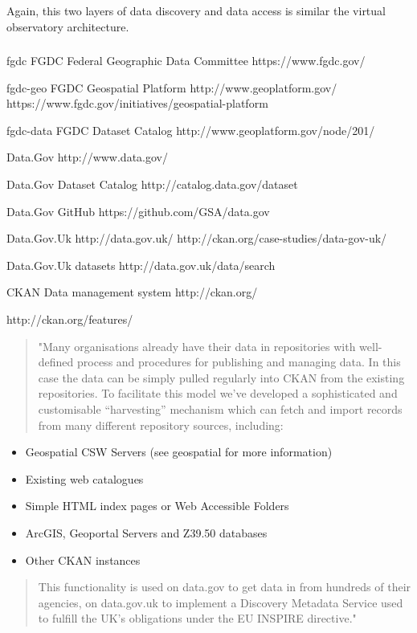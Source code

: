 \documentclass{article}
\begin{document}
Again, this two layers of data discovery and data access
is similar the virtual observatory architecture.


\subsubsection{}

fgdc
FGDC
Federal Geographic Data Committee
https://www.fgdc.gov/

fgdc-geo
FGDC Geospatial Platform
http://www.geoplatform.gov/
https://www.fgdc.gov/initiatives/geospatial-platform

fgdc-data
FGDC Dataset Catalog
http://www.geoplatform.gov/node/201/%

Data.Gov
http://www.data.gov/

Data.Gov Dataset Catalog
http://catalog.data.gov/dataset

Data.Gov GitHub
https://github.com/GSA/data.gov


Data.Gov.Uk
http://data.gov.uk/
http://ckan.org/case-studies/data-gov-uk/

Data.Gov.Uk datasets
http://data.gov.uk/data/search



CKAN Data management system
http://ckan.org/


http://ckan.org/features/
\begin{quote}
"Many organisations already have their data in repositories with well-defined process and procedures
for publishing and managing data. In this case the data can be simply pulled regularly into CKAN
from the existing repositories. To facilitate this model we’ve developed a sophisticated and
customisable “harvesting” mechanism which can fetch and import records from many different
repository sources, including:
\end{quote}
\begin{itemize}
\item Geospatial CSW Servers (see geospatial for more information)
\item Existing web catalogues
\item Simple HTML index pages or Web Accessible Folders
\item ArcGIS, Geoportal Servers and Z39.50 databases
\item Other CKAN instances
\end{itemize}
\begin{quote}
This functionality is used on data.gov to get data in from hundreds of their agencies,
on data.gov.uk to implement a Discovery Metadata Service used to fulfill the UK’s
obligations under the EU INSPIRE directive."
\end{quote}
\end{document}
